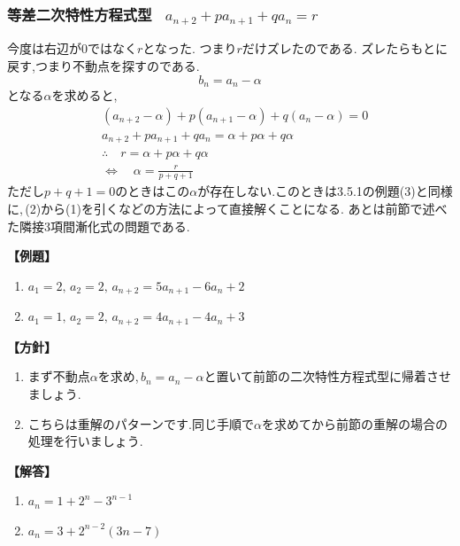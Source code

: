   \subsubsection{等差二次特性方程式型 \, $\displaystyle a_{n+2}+pa_{n+1}+qa_n=r$}
    今度は右辺が0ではなく$r$となった.
    つまり$r$だけズレたのである.
    ズレたらもとに戻す,つまり不動点を探すのである.
    \[
      b_n=a_n-\alpha
    \]
    となる$\alpha$を求めると,
    \begin{align*}
      &(a_{n+2}-\alpha)+p(a_{n+1}-\alpha)+q(a_n-\alpha)=0\\
      &a_{n+2}+pa_{n+1}+qa_n=\alpha+p\alpha+q\alpha\\
      &\therefore \quad r=\alpha +p\alpha +q\alpha\\
      &\Leftrightarrow \quad \alpha=\frac{r}{p+q+1}
    \end{align*}
    ただし$p+q+1=0$のときはこの$\alpha$が存在しない.このときは3.5.1の例題(3)と同様に,\,(2)から(1)を引くなどの方法によって直接解くことになる.
    あとは前節で述べた隣接3項間漸化式の問題である.

    \noindent \textbf{【例題】}
    \begin{enumerate}[label=(\arabic*),parsep=3pt]
      \item $\displaystyle a_1=2,\,a_2=2,\, a_{n+2}=5a_{n+1}-6a_n+2$
      \item $\displaystyle a_1=1,\,a_2=2,\, a_{n+2}=4a_{n+1}-4a_n+3$
    \end{enumerate}

    \noindent\textbf{【方針】}
    \begin{enumerate}[label=(\arabic*),parsep=3pt]
      \item まず不動点$\alpha$を求め,\,$b_n=a_n-\alpha$と置いて前節の二次特性方程式型に帰着させましょう.
      \item こちらは重解のパターンです.同じ手順で$\alpha$を求めてから前節の重解の場合の処理を行いましょう.
    \end{enumerate}

    \noindent\textbf{【解答】}
    \begin{enumerate}[label=(\arabic*),parsep=3pt]
      \item $\displaystyle a_n=1+2^n-3^{n-1}$
      \item $\displaystyle a_n=3+2^{n-2}(3n-7)$
    \end{enumerate}

